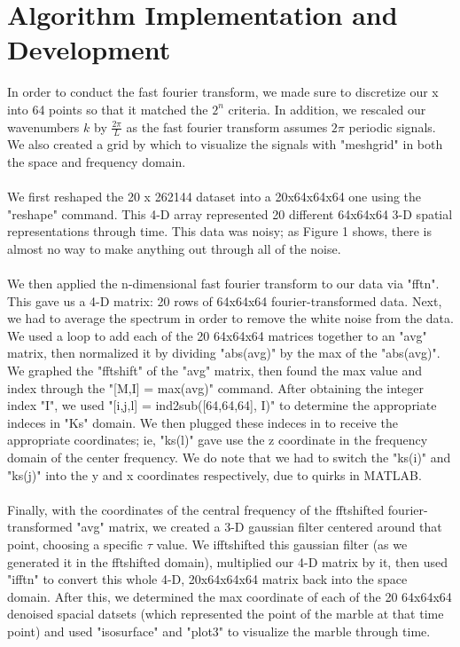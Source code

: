 \documentclass{article}
\begin{document}
\section*{\fontsize{19}{15}\selectfont Algorithm Implementation and Development}
In order to conduct the fast fourier transform, we made sure to discretize our x into 64 points so that it matched the $2^n$ criteria. In addition, we rescaled our wavenumbers $k$ by $\frac{2\pi}{L}$ as the fast fourier transform assumes $2\pi$ periodic signals. We also created a grid by which to visualize the signals with "meshgrid" in both the space and frequency domain. \\ \\
We first reshaped the 20 x 262144 dataset into a 20x64x64x64 one using the "reshape" command. This 4-D array represented 20 different 64x64x64 3-D spatial representations through time. This data was noisy; as Figure 1 shows, there is almost no way to make anything out through all of the noise.  \\ \\
We then applied the n-dimensional fast fourier transform to our data via "fftn". This gave us a 4-D matrix: 20 rows of 64x64x64 fourier-transformed data. Next, we had to average the spectrum in order to remove the white noise from the data. We used a loop to add each of the 20 64x64x64 matrices together to an "avg" matrix, then normalized it by dividing "abs(avg)" by the max of the "abs(avg)". We graphed the "fftshift" of the "avg" matrix, then found the max value and index through the "[M,I] = max(avg)" command. After obtaining the integer index "I", we used "[i,j,l] = ind2sub([64,64,64], I)" to determine the appropriate indeces in "Ks" domain. We then plugged these indeces in to receive the appropriate coordinates; ie, "ks(l)" gave use the z coordinate in the frequency domain of the center frequency. We do note that we had to switch the "ks(i)" and "ks(j)" into the y and x coordinates respectively, due to quirks in MATLAB.  \\ \\
Finally, with the coordinates of the central frequency of the fftshifted fourier-transformed "avg" matrix, we created a 3-D gaussian filter centered around that point, choosing a specific $\tau$ value. We ifftshifted this gaussian filter (as we generated it in the fftshifted domain), multiplied our 4-D matrix by it, then used "ifftn" to convert this whole 4-D, 20x64x64x64 matrix back into the space domain. After this, we determined the max coordinate of each of the 20 64x64x64 denoised spacial datsets (which represented the point of the marble at that time point) and used "isosurface" and "plot3" to visualize the marble through time.
\end{document}
